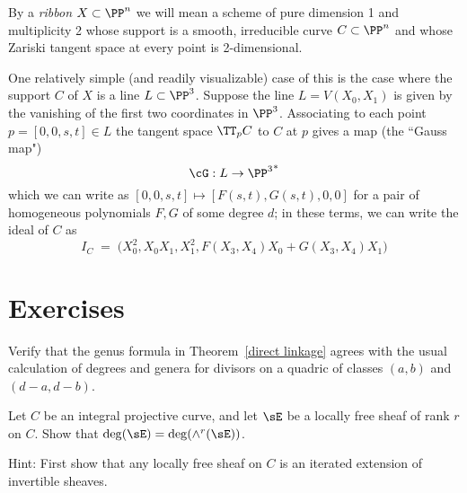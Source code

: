 \begin{definition}
By a \emph{ribbon} $X \subset \PP^n$ we will mean a scheme of pure dimension 1 and multiplicity 2 whose support is a smooth, irreducible curve $C \subset \PP^n$ and whose Zariski tangent space at every point is 2-dimensional.
\end{definition}


One relatively simple (and readily visualizable) case of this is the case where the support $C$ of $X$ is a line $L \subset \PP^3$. Suppose the line $L=V(X_0,X_1)$ is given by the vanishing of the first two coordinates in $\PP^3$. Associating to each point $p = [0,0,s,t] \in L$ the tangent space $\TT_pC$ to $C$ at $p$ gives a map (the ``Gauss map")
$$
\cG : L \to {\PP^3}^*
$$
which we can write as $[0,0,s,t] \mapsto [F(s,t),G(s,t),0,0]$ for a pair of homogeneous polynomials $F, G$ of some degree $d$; in these terms, we can write the ideal of $C$ as
$$
I_C \; = \; \big(X_0^2, X_0X_1, X_1^2, F(X_3,X_4)X_0 + G(X_3,X_4)X_1\big)
$$

\section{Exercises}

\begin{exercise}
 Verify that the genus formula in Theorem~\ref{direct linkage} agrees with the usual calculation of degrees and genera for divisors on a quadric of
 classes $(a,b)$ and $(d-a, d-b)$.
\end{exercise}

\begin{exercise}
 Let $C$ be an integral projective curve, and let $\sE$ be a locally free sheaf of rank $r$ on $C$. Show that
 $\deg(\sE) = \deg(\wedge^r(\sE))$.
 
 Hint: First show that any locally free sheaf on $C$ is an iterated extension of invertible sheaves.
\end{exercise}

